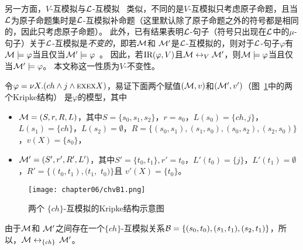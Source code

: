 另一方面，$V$-互模拟与${\cal L}$-互模拟
~\cite{d1996uniform}类似，不同的是$V$-互模拟只考虑原子命题，且当${\cal L}$为原子命题集时是${\cal L}$-互模拟补命题（这里默认除了原子命题之外的符号都是相同的，因此只考虑原子命题）。
此外，已有结果表明${\cal L}$-句子（符号只出现在${\cal L}$中的$\mu$-句子）关于${\cal L}$-互模拟是{\em 不变的}，即若${\cal M}$和 ${\cal M}'$是${\cal L}$-互模拟的，则对于${\cal L}$-句子$\varphi$有${\cal M} \models \varphi$当且仅当${\cal M}' \models \varphi$~\cite{d1996uniform,bradfield2018mu}。
因此，若$\textrm{IR}(\varphi, V)$且${\cal M} \leftrightarrow_V {\cal M}'$，则${\cal M} \models \varphi$当且仅当${\cal M}' \models \varphi$。
本文称这一性质为$V$-不变性。
\begin{example}\label{exmp:c06:bisim}
	 令$\varphi= \nu X.( ch \wedge j \wedge  \textsc{e} \textsc{x} \textsc{e} \textsc{x} X)$，易证下面两个赋值$({\cal M},v)$和$({\cal M}',v')$（图~\ref{chapter06:fig:bisim}中的两个Kripke结构）
	 是$\varphi$的模型，其中
	\begin{itemize}
		\item ${\cal M}=(S,r,R,L)$，其中$S=\{s_0,s_1,s_2\}$，$r=s_0$，$L(s_0)=\{ch, j\}$，$L(s_1)=\{ch\}$，$L(s_2)=\emptyset$，$R=\{(s_0,s_1), (s_1,s_0), (s_0,s_2), (s_2,s_0)\}$，$v(X)=\{s_0\}$，
		\item  ${\cal M}'=(S',r',R',L')$，其中$S'=\{t_0,t_1\}, r'=t_0$，$L'(t_0)=\{j\}$，$L'(t_1)=\emptyset$，$R'=\{(t_0,t_1), (t_1,$ $t_0)\}$且
		$v'(X)=\{t_0\}$。
	\end{itemize} 
	
		\begin{figure}[h]%
		\centering
		\texttt{[image: chapter06/chvB1.png]}
		\caption{两个 $\{ch\}$-互模拟的Kripke结构示意图}\label{chapter06:fig:bisim}
		
	\end{figure}
	
	由于${\cal M}$和 ${\cal M}'$之间存在一个$\{ch\}$-互模拟关系${\cal B}=\{(s_0, t_0), (s_1, t_1), (s_2, t_1)\}$，所以，${\cal M} \leftrightarrow_{\{ch\}}$ ${\cal M}'$。
\end{example}
